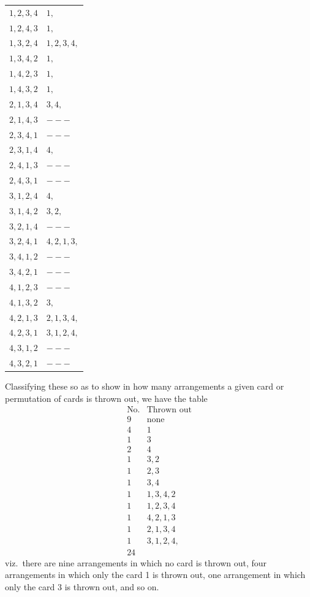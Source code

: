 \documentclass[11pt,a4paper]{article}
\begin{document}
\begin{center}
\begin{tabular}{ll}
$1, 2, 3, 4$ & $1,$\\
$1, 2, 4, 3$ & $1,$\\
$1, 3, 2, 4$ & $1, 2, 3, 4,$\\
$1, 3, 4, 2$ & $1,$\\
$1, 4, 2, 3$ & $1,$\\
$1, 4, 3, 2$ & $1,$\\[4pt]
$2, 1, 3, 4$ & $3, 4,$\\
$2, 1, 4, 3$ & $---$\\
$2, 3, 4, 1$ & $---$\\
$2, 3, 1, 4$ & $4,$\\
$2, 4, 1, 3$ & $---$\\
$2, 4, 3, 1$ & $---$\\[4pt]
$3, 1, 2, 4$ & $4,$\\
$3, 1, 4, 2$ & $3, 2,$\\
$3, 2, 1, 4$ & $---$\\
$3, 2, 4, 1$ & $4, 2, 1, 3,$\\
$3, 4, 1, 2$ & $---$\\
$3, 4, 2, 1$ & $---$\\[4pt]
$4, 1, 2, 3$ & $---$\\
$4, 1, 3, 2$ & $3,$\\
$4, 2, 1, 3$ & $2, 1, 3, 4,$\\
$4, 2, 3, 1$ & $3, 1, 2, 4,$\\
$4, 3, 1, 2$ & $---$\\
$4, 3, 2, 1$ & $---$\\
\end{tabular}
\end{center}

\newpage


\noindent Classifying these so as to show in how many arrangements a given card or permutation of cards is thrown out, we have the table
\[
\begin{array}{cl}
\text{No.} & \text{Thrown out}\\
\hline
9 & \text{none}\\
4 & 1\\
1 & 3\\
2 & 4\\
1 & 3, 2\\
1 & 2, 3\\
1 & 3, 4\\
1 & 1, 3, 4, 2\\
1 & 1, 2, 3, 4\\
1 & 4, 2, 1, 3\\
1 & 2, 1, 3, 4\\
1 & 3, 1, 2, 4,\\
\hline
24 &
\end{array}
\]
viz.\ there are nine arrangements in which no card is thrown out, four arrangements in which only the card 1 is thrown out, one arrangement in which only the card 3 is thrown out, and so on.
\end{document}
